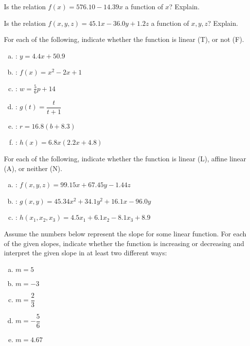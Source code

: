 \documentclass[11pt,letterpaper]{article}
\begin{document}
\newpage



 Is the relation $f(x)= 576.10 - 14.39x$ a function of $x$? Explain. 



\newpage



 Is the relation $f(x, y, z)= 45.1x - 36.0y + 1.2z$ a function of $x, y, z$? Explain. 



\newpage



 For each of the following, indicate whether the function is linear (T), or not (F). 
	\begin{enumerate}[(a)]
	\item \uans{1.6cm}: $y= 4.4x + 50.9$
	\item \uans{1.6cm}: $f(x)= x^2 - 2x + 1$
	\item \uans{1.6cm}: $w= \frac{5}{6}p + 14$
	\item \uans{1.6cm}: $g(t)= \dfrac{t}{t + 1}$
	\item \uans{1.6cm}: $r= 16.8(b + 8.3)$
	\item \uans{1.6cm}: $h(x)= 6.8x(2.2x + 4.8)$
	\end{enumerate}



\newpage



 For each of the following, indicate whether the function is linear (L), affine linear (A), or neither (N). 
	\begin{enumerate}[(a)]
	\item \uans{1.6cm}: $f(x, y, z)= 99.15x + 67.45y - 1.44z$
	\item \uans{1.6cm}: $g(x, y)= 45.34x^2 + 34.1y^2 + 16.1x - 96.0y$
	\item \uans{1.6cm}: $h(x_1, x_2, x_3)= 4.5x_1 + 6.1x_2 - 8.1x_3 + 8.9$
	\end{enumerate}



\newpage



 Assume the numbers below represent the slope for some linear function. For each of the given slopes, indicate whether the function is increasing or decreasing and interpret the given slope in at least two different ways:
	\begin{enumerate}[(a)]
	\item $m= 5$
	\item $m= -3$
	\item $m= \dfrac{2}{3}$
	\item $m= -\dfrac{5}{6}$
	\item $m= 4.67$
	\end{enumerate}
\end{document}

